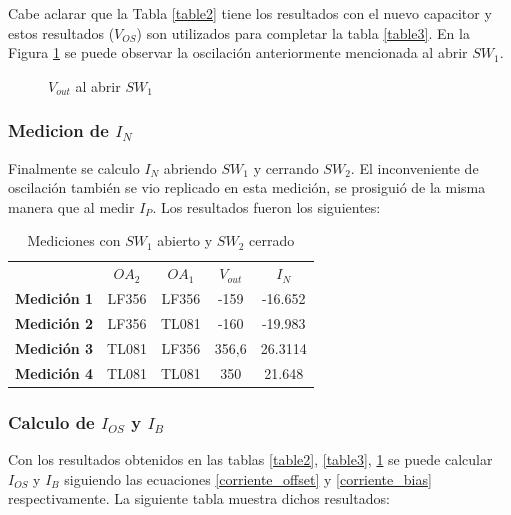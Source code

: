 Cabe aclarar que la Tabla \ref{table2} tiene los resultados con el nuevo capacitor y estos resultados ($V_{OS}$) son utilizados para completar la tabla \ref{table3}. 
En la Figura \ref{medicion} se puede observar la oscilación anteriormente mencionada al abrir $SW_1$. 

\begin{figure}[h!]                                                       
     \caption{$V_{out}$ al abrir $SW_1$}
     \label{medicion}
     \end{figure}

\subsubsection{Medicion de $I_{N}$}


Finalmente se calculo $I_N$ abriendo $SW_1$ y cerrando $SW_2$. El inconveniente de oscilación también se vio replicado en esta medición, se prosiguió de la misma manera que al medir $I_P$.  
Los resultados fueron los siguientes:

\begin{table}[ht]
    \centering
    \caption{Mediciones con $SW_1$ abierto y $SW_2$ cerrado}
    \label{table4}
    \begin{tabular}{@{}ccccc@{}}
    \textbf{}           & \textbf{$OA_2$} & \textbf{$OA_1$} & \textbf{$V_{out}$} & \textbf{$I_N$} \\ 
    \textbf{Medición 1} & LF356          & LF356          & -159              &  -16.652            \\
    \textbf{Medición 2} & LF356          & TL081          & -160              &  -19.983            \\
    \textbf{Medición 3} & TL081          & LF356          & 356,6              &  26.3114            \\
    \textbf{Medición 4} & TL081          & TL081          & 350              &  21.648            \\ 
    \end{tabular}
\end{table}


\subsubsection{Calculo de $I_{OS}$ y $I_B$}

Con los resultados obtenidos en las tablas \ref{table2}, \ref{table3}, \ref{table4} se puede calcular $I_{OS}$ y $I_B$ siguiendo las ecuaciones \ref{corriente_offset} y \ref{corriente_bias} respectivamente. La siguiente tabla muestra dichos resultados:


